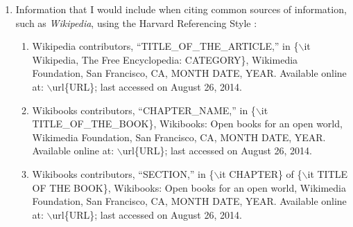 \documentclass[letter,12pt]{article}
\begin{document}
\begin{enumerate}
\begin{enumerate}
\begin{enumerate}
			\begin{enumerate} \itemsep -1pt
			\item \textcolor{blue}{Alternatively, an {\it OCaml} program/script for this task is: {\Huge [INSERT-URL-HERE!!!]}.}
			\end{enumerate}
		\end{enumerate}
	\item Typeset the \LaTeX\ document: \vspace{-0.2cm}
		\begin{enumerate} \itemsep -2pt
		\item Typesetting the \LaTeX\ document using the \LaTeX\ {\tt $\backslash$nocite\{$\ast$\}} command should run faster than using a \LaTeX\ {\tt $\backslash$cite} command or multiple \LaTeX\ {\tt $\backslash$cite} commands.
		\end{enumerate}
	\item Check that the font and style of the reference list is correct.
	\item If there are errors, correct the errors as appropriate.
	\item Finally, the {\sc Bib}\TeX\ database should be correct.
	\end{enumerate}
\item Information that I would include when citing common sources of information, such as {\it Wikipedia}, using the Harvard Referencing Style \cite{MendeleyLimitedStaff2022b,MendeleyLimitedStaff2022a,Turabian2018,Turabian2007,WikipediaContributors2023e,WikipediaContributors2023d}: \vspace{-0.3cm}
	\begin{enumerate} \itemsep -2pt
	\item Wikipedia contributors, ``TITLE\_OF\_THE\_ARTICLE,'' in \{$\backslash$it Wikipedia, The Free Encyclopedia: CATEGORY\}, Wikimedia Foundation, San Francisco, CA, MONTH DATE, YEAR. Available online at: $\backslash$url\{URL\}; last accessed on August 26, 2014.
	\item Wikibooks contributors, ``CHAPTER\_NAME,'' in \{$\backslash$it TITLE\_OF\_THE\_BOOK\}, Wikibooks: Open books for an open world, Wikimedia Foundation, San Francisco, CA, MONTH DATE, YEAR. Available online at: $\backslash$url\{URL\}; last accessed on August 26, 2014.
	\item Wikibooks contributors, ``SECTION,'' in \{$\backslash$it CHAPTER\} of \{$\backslash$it TITLE OF THE BOOK\}, Wikibooks: Open books for an open world, Wikimedia Foundation, San Francisco, CA, MONTH DATE, YEAR. Available online at: $\backslash$url\{URL\}; last accessed on August 26, 2014.

\end{enumerate}
\end{enumerate}
\end{document}
